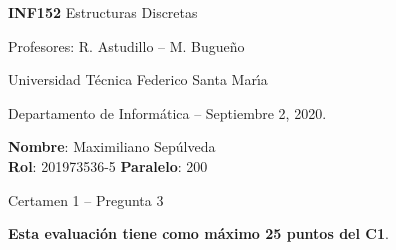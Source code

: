 \documentclass[legalpaper,10pt]{article}
\begin{document}
\thispagestyle{empty}

\begin{minipage}[t]{0.6\textwidth}

{\LARGE \textbf{INF152} Estructuras Discretas}

{\large Profesores: R. Astudillo -- M. Bugueño}

Universidad Técnica Federico Santa Mar\'{\i}a

Departamento de Informática -- Septiembre 2, 2020.

\end{minipage}
\hfill
\begin{minipage}[t]{0.35\textwidth}
\textbf{Nombre}: Maximiliano Sepúlveda \\[0.3cm]
\textbf{Rol}: 201973536-5 \textbf{Paralelo}: 200
\end{minipage}

\vspace{0.8cm}

{\Large Certamen 1 -- Pregunta 3}

\vspace{0.4cm}

\textbf{Esta evaluación tiene como máximo 25 puntos del C1}.
\end{document}
